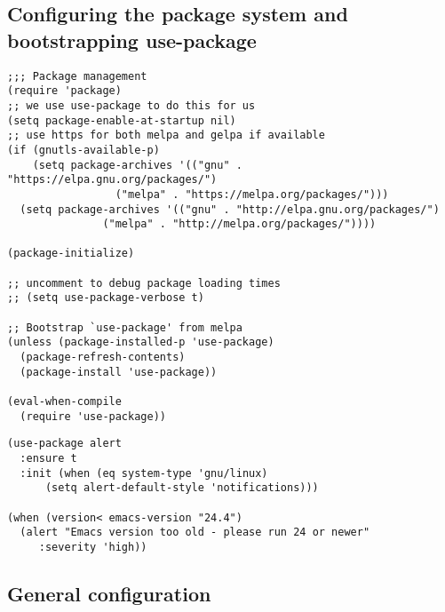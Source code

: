 \documentclass[11pt]{article}
\begin{document}
\subsection{Configuring the package system and bootstrapping use-package}
\label{sec-0-1}

\begin{verbatim}
;;; Package management
(require 'package)
;; we use use-package to do this for us
(setq package-enable-at-startup nil)
;; use https for both melpa and gelpa if available
(if (gnutls-available-p)
    (setq package-archives '(("gnu" . "https://elpa.gnu.org/packages/")
			     ("melpa" . "https://melpa.org/packages/")))
  (setq package-archives '(("gnu" . "http://elpa.gnu.org/packages/")
			   ("melpa" . "http://melpa.org/packages/"))))

(package-initialize)

;; uncomment to debug package loading times
;; (setq use-package-verbose t)

;; Bootstrap `use-package' from melpa
(unless (package-installed-p 'use-package)
  (package-refresh-contents)
  (package-install 'use-package))

(eval-when-compile
  (require 'use-package))
\end{verbatim}


\begin{verbatim}
(use-package alert
  :ensure t
  :init (when (eq system-type 'gnu/linux)
	  (setq alert-default-style 'notifications)))

(when (version< emacs-version "24.4")
  (alert "Emacs version too old - please run 24 or newer"
	 :severity 'high))
\end{verbatim}

\subsection{General configuration}
\label{sec-0-2}
\end{document}
